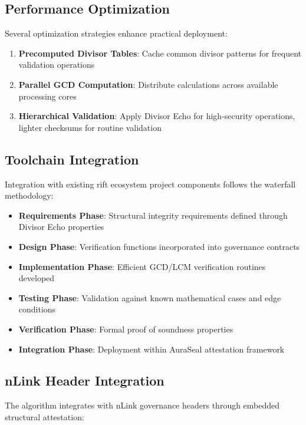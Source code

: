 \documentclass[11pt,letterpaper]{article}
\begin{document}
\subsection{Performance Optimization}

Several optimization strategies enhance practical deployment:

\begin{enumerate}
\item \textbf{Precomputed Divisor Tables}: Cache common divisor patterns for frequent validation operations
\item \textbf{Parallel GCD Computation}: Distribute calculations across available processing cores
\item \textbf{Hierarchical Validation}: Apply Divisor Echo for high-security operations, lighter checksums for routine validation
\end{enumerate}

\subsection{Toolchain Integration}

Integration with existing rift ecosystem project components follows the waterfall methodology:

\begin{itemize}
\item \textbf{Requirements Phase}: Structural integrity requirements defined through Divisor Echo properties
\item \textbf{Design Phase}: Verification functions incorporated into governance contracts
\item \textbf{Implementation Phase}: Efficient GCD/LCM verification routines developed
\item \textbf{Testing Phase}: Validation against known mathematical cases and edge conditions
\item \textbf{Verification Phase}: Formal proof of soundness properties
\item \textbf{Integration Phase}: Deployment within AuraSeal attestation framework
\end{itemize}

\subsection{nLink Header Integration}

The algorithm integrates with nLink governance headers through embedded structural attestation:
\end{document}
